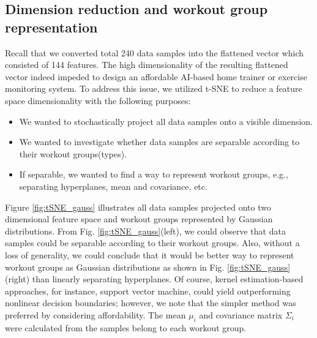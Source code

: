 \documentclass{ISIS}
\begin{document}

\subsection{Dimension reduction and workout group representation}
Recall that we converted total  240 data samples into the flattened vector which consisted of 144 features. The high dimensionality of the resulting flattened vector indeed impeded to design an affordable AI-based home trainer or exercise monitoring system. To address this issue, we utilized t-SNE to reduce a feature space dimensionality with the following purposes:
%
\begin{itemize}
	\item We wanted to stochastically project all data samples onto a visible dimension.   
	\item We wanted to investigate whether data samples are separable according to their workout groups(types).
	\item If separable, we wanted to find a way to represent workout groups, e.g., separating hyperplanes, mean and covariance, etc. 
\end{itemize}

Figure \ref{fig:tSNE_gauss} illustrates all data samples projected onto two dimensional feature space and workout groups represented by Gaussian distributions. From Fig. \ref{fig:tSNE_gauss}(left), we could observe that data samples could be separable according to their workout groups. Also, without a loss of generality, we could conclude that it would be better way to represent workout groups as Gaussian distributions as shown in Fig. \ref{fig:tSNE_gauss}(right) than linearly separating hyperplanes. Of course, kernel estimation-based approaches, for instance, support vector machine, could yield outperforming nonlinear decision boundaries; however, we note that the simpler method was preferred by considering affordability. The mean $\mu_i$ and covariance matrix $\Sigma_i$ were calculated from the samples belong to each workout group.     
\end{document}
